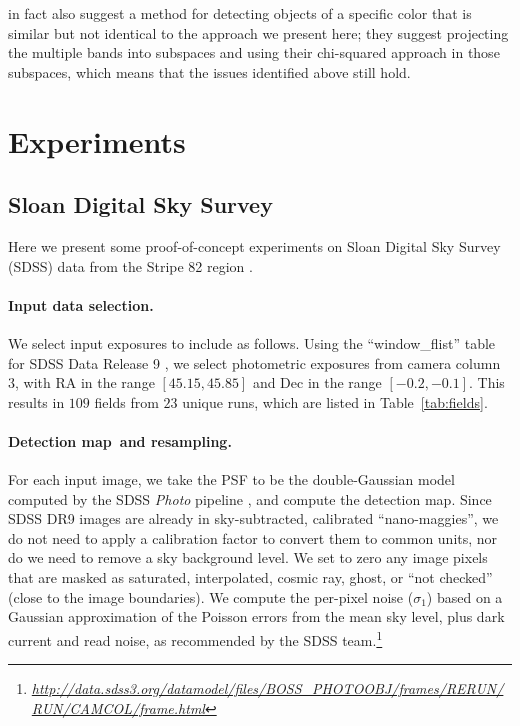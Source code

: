 \documentclass[letterpaper,preprint]{aastex}
\newcommand{\tabref}[1]{\mbox{Table~\ref{#1}}}
\newcommand{\niceurl}[1]{\mbox{\href{#1}{\textsl{#1}}}}
\newcommand{\detmap}{detection map}
\newcommand{\Detmap}{Detection map}
\begin{document}
\cite{szalay} in fact also suggest a method for detecting objects of a
specific color that is similar but not identical to the approach we
present here; they suggest projecting the multiple bands into
subspaces and using their chi-squared approach in those subspaces,
which means that the issues identified above still hold.




\section{Experiments}

\subsection{Sloan Digital Sky Survey}

Here we present some proof-of-concept experiments on Sloan Digital Sky
Survey (SDSS) data from the Stripe 82 region \cite{sdss}.


\paragraph{Input data selection.}
We select input exposures to include as follows.  Using the
``window\_flist'' table for SDSS Data Release 9 \cite{dr9}, we select
photometric exposures from camera column 3, with RA in the range
$[45.15, 45.85]$ and Dec in the range $[-0.2, -0.1]$.  This results in
$109$ fields from $23$ unique runs, which are listed in
\tabref{tab:fields}.

\paragraph{\Detmap\ and resampling.}
For each input image, we take the PSF to be the double-Gaussian model
computed by the SDSS \emph{Photo} pipeline \citep{photo, sdss-edr}, and compute
the \detmap.  Since SDSS DR9 images are already in sky-subtracted,
calibrated ``nano-maggies'', we do not need to apply a calibration
factor to convert them to common units, nor do we need to remove a sky
background level.  We set to zero any image pixels that are masked as
saturated, interpolated, cosmic ray, ghost, or ``not checked'' (close
to the image boundaries).
We compute the per-pixel noise ($\sigma_1$) based on a Gaussian
approximation of the Poisson errors from the mean sky level, plus dark
current and read noise, as recommended by the SDSS
team.\footnote{\niceurl{http://data.sdss3.org/datamodel/files/BOSS\_PHOTOOBJ/frames/RERUN/RUN/CAMCOL/frame.html}}
\end{document}
